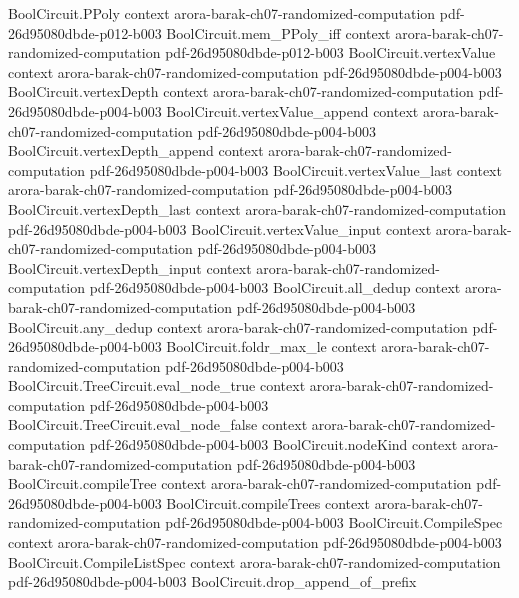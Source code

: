 \begin{theorem}
  {BoolCircuit.PPoly}
  {context}
  {arora-barak-ch07-randomized-computation}
  {pdf-26d95080dbde-p012-b003}
\proofstep
  {BoolCircuit.mem_PPoly_iff}
  {context}
  {arora-barak-ch07-randomized-computation}
  {pdf-26d95080dbde-p012-b003}
\proofstep
  {BoolCircuit.vertexValue}
  {context}
  {arora-barak-ch07-randomized-computation}
  {pdf-26d95080dbde-p004-b003}
\proofstep
  {BoolCircuit.vertexDepth}
  {context}
  {arora-barak-ch07-randomized-computation}
  {pdf-26d95080dbde-p004-b003}
\proofstep
  {BoolCircuit.vertexValue_append}
  {context}
  {arora-barak-ch07-randomized-computation}
  {pdf-26d95080dbde-p004-b003}
\proofstep
  {BoolCircuit.vertexDepth_append}
  {context}
  {arora-barak-ch07-randomized-computation}
  {pdf-26d95080dbde-p004-b003}
\proofstep
  {BoolCircuit.vertexValue_last}
  {context}
  {arora-barak-ch07-randomized-computation}
  {pdf-26d95080dbde-p004-b003}
\proofstep
  {BoolCircuit.vertexDepth_last}
  {context}
  {arora-barak-ch07-randomized-computation}
  {pdf-26d95080dbde-p004-b003}
\proofstep
  {BoolCircuit.vertexValue_input}
  {context}
  {arora-barak-ch07-randomized-computation}
  {pdf-26d95080dbde-p004-b003}
\proofstep
  {BoolCircuit.vertexDepth_input}
  {context}
  {arora-barak-ch07-randomized-computation}
  {pdf-26d95080dbde-p004-b003}
\proofstep
  {BoolCircuit.all_dedup}
  {context}
  {arora-barak-ch07-randomized-computation}
  {pdf-26d95080dbde-p004-b003}
\proofstep
  {BoolCircuit.any_dedup}
  {context}
  {arora-barak-ch07-randomized-computation}
  {pdf-26d95080dbde-p004-b003}
\proofstep
  {BoolCircuit.foldr_max_le}
  {context}
  {arora-barak-ch07-randomized-computation}
  {pdf-26d95080dbde-p004-b003}
\proofstep
  {BoolCircuit.TreeCircuit.eval_node_true}
  {context}
  {arora-barak-ch07-randomized-computation}
  {pdf-26d95080dbde-p004-b003}
\proofstep
  {BoolCircuit.TreeCircuit.eval_node_false}
  {context}
  {arora-barak-ch07-randomized-computation}
  {pdf-26d95080dbde-p004-b003}
\proofstep
  {BoolCircuit.nodeKind}
  {context}
  {arora-barak-ch07-randomized-computation}
  {pdf-26d95080dbde-p004-b003}
\proofstep
  {BoolCircuit.compileTree}
  {context}
  {arora-barak-ch07-randomized-computation}
  {pdf-26d95080dbde-p004-b003}
\proofstep
  {BoolCircuit.compileTrees}
  {context}
  {arora-barak-ch07-randomized-computation}
  {pdf-26d95080dbde-p004-b003}
\proofstep
  {BoolCircuit.CompileSpec}
  {context}
  {arora-barak-ch07-randomized-computation}
  {pdf-26d95080dbde-p004-b003}
\proofstep
  {BoolCircuit.CompileListSpec}
  {context}
  {arora-barak-ch07-randomized-computation}
  {pdf-26d95080dbde-p004-b003}
\proofstep
  {BoolCircuit.drop_append_of_prefix}

\end{theorem}
